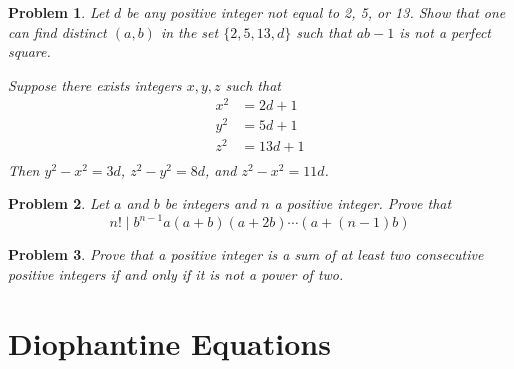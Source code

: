 \documentclass{scrartcl}
\newtheorem{a_problem}{Problem}
\begin{document}
\begin{a_problem}
Let $d$ be any positive integer not equal to 2, 5, or 13. Show that one can find distinct $(a,b)$ in the set $\{2,5,13,d\}$ such that $ab-1$ is not a perfect square.
	\begin{soln}
		Suppose there exists integers $x,y,z$ such that
		\begin{align*}
			x^2 &= 2d+1 \\
			y^2 &= 5d+1 \\
			z^2 &= 13d+1 \\
		\end{align*}
		Then $y^2-x^2 = 3d$, $z^2 - y^2 = 8d$, and $z^2 - x^2 = 11d$.
	\end{soln}
\end{a_problem}

\begin{a_problem}
	Let $a$ and $b$ be integers and $n$ a positive integer. Prove that 
	\[n! \mid b^{n-1}a(a+b)(a+2b)\cdots(a+(n-1)b)\]
\end{a_problem}

\begin{a_problem}
	Prove that a positive integer is a sum of at least two consecutive positive integers if and only if it is not a power of two.
\end{a_problem}

\section{Diophantine Equations}
\end{document}

